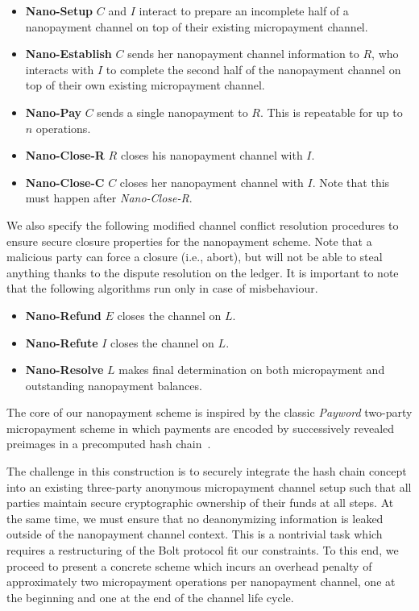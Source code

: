 \begin{itemize}
\item \textbf{Nano-Setup} $C$ and $I$ interact to prepare an incomplete half of
  a nanopayment channel on top of their existing micropayment channel.
\item \textbf{Nano-Establish} $C$ sends her nanopayment channel information to
  $R$, who interacts with $I$ to complete the second half of the nanopayment
  channel on top of their own existing micropayment channel.
\item \textbf{Nano-Pay} $C$ sends a single nanopayment to $R$. This is
  repeatable for up to $n$ operations.
\item \textbf{Nano-Close-R} $R$ closes his nanopayment channel with $I$.
\item \textbf{Nano-Close-C} $C$ closes her nanopayment channel with $I$. Note
  that this must happen after \emph{Nano-Close-R}.
\end{itemize}

We also specify the following modified channel conflict resolution procedures to
ensure secure closure properties for the nanopayment scheme. Note that a
malicious party can force a closure (i.e., abort), but will not be able to steal
anything thanks to the dispute resolution on the ledger. It is important to note
that the following algorithms run only in case of misbehaviour.

\begin{itemize}
\item \textbf{Nano-Refund} $E$ closes the channel on $L$.
\item \textbf{Nano-Refute} $I$ closes the channel on $L$.
\item \textbf{Nano-Resolve} $L$ makes final determination on both micropayment
  and outstanding nanopayment balances.
\end{itemize}

The core of our nanopayment scheme is inspired by the classic \emph{Payword}
two-party micropayment scheme in which payments are encoded by successively
revealed preimages in a precomputed hash chain~\cite{rivest1996payword}.

The challenge in this construction is to securely integrate the hash chain
concept into an existing three-party anonymous micropayment channel setup such
that all parties maintain secure cryptographic ownership of their funds at all
steps. At the same time, we must ensure that no deanonymizing information is
leaked outside of the nanopayment channel context. This is a nontrivial task
which requires a restructuring of the Bolt protocol fit our constraints. To this
end, we proceed to present a concrete scheme which incurs an overhead penalty of
approximately two micropayment operations per nanopayment channel, one at the
beginning and one at the end of the channel life cycle.

